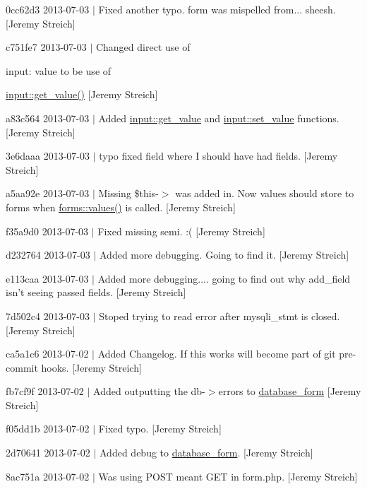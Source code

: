 \begin{DoxyItemize}
\item 0cc62d3 2013-\/07-\/03 $|$ Fixed another typo. form was mispelled from... sheesh. \mbox{[}Jeremy Streich\mbox{]}
\item c751fe7 2013-\/07-\/03 $|$ Changed direct use of \begin{DoxyParagraph}{input\-:}
value to be use of 
\end{DoxyParagraph}
\hyperlink{classinput_a1b3bcdbb596a1154a944a169ac67f547}{input\-::get\-\_\-value()} \mbox{[}Jeremy Streich\mbox{]}
\item a83c564 2013-\/07-\/03 $|$ Added \hyperlink{classinput_a1b3bcdbb596a1154a944a169ac67f547}{input\-::get\-\_\-value} and \hyperlink{classinput_a2383e00d55bf3dbcc7071b2fe1336aec}{input\-::set\-\_\-value} functions. \mbox{[}Jeremy Streich\mbox{]}
\item 3e6daaa 2013-\/07-\/03 $|$ typo fixed field where I should have had fields. \mbox{[}Jeremy Streich\mbox{]}
\item a5aa92e 2013-\/07-\/03 $|$ Missing \$this-\/$>$ was added in. Now values should store to forms when \hyperlink{classforms_ad66e3f3a4d5332bbd15e53680930d786}{forms\-::values()} is called. \mbox{[}Jeremy Streich\mbox{]}
\item f35a9d0 2013-\/07-\/03 $|$ Fixed missing semi. \-:( \mbox{[}Jeremy Streich\mbox{]}
\item d232764 2013-\/07-\/03 $|$ Added more debugging. Going to find it. \mbox{[}Jeremy Streich\mbox{]}
\item e113caa 2013-\/07-\/03 $|$ Added more debugging.... going to find out why add\-\_\-field isn't seeing passed fields. \mbox{[}Jeremy Streich\mbox{]}
\item 7d502c4 2013-\/07-\/03 $|$ Stoped trying to read error after mysqli\-\_\-stmt is closed. \mbox{[}Jeremy Streich\mbox{]}
\item ca5a1c6 2013-\/07-\/02 $|$ Added Changelog. If this works will become part of git pre-\/commit hooks. \mbox{[}Jeremy Streich\mbox{]}
\item fb7cf9f 2013-\/07-\/02 $|$ Added outputting the db-\/$>$errors to \hyperlink{classdatabase__form}{database\-\_\-form} \mbox{[}Jeremy Streich\mbox{]}
\item f05dd1b 2013-\/07-\/02 $|$ Fixed typo. \mbox{[}Jeremy Streich\mbox{]}
\item 2d70641 2013-\/07-\/02 $|$ Added debug to \hyperlink{classdatabase__form}{database\-\_\-form}. \mbox{[}Jeremy Streich\mbox{]}
\item 8ac751a 2013-\/07-\/02 $|$ Was using P\-O\-S\-T meant G\-E\-T in form.\-php. \mbox{[}Jeremy Streich\mbox{]}

\end{DoxyItemize}
